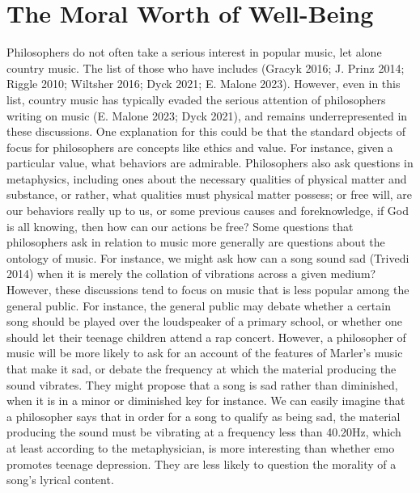 \documentclass[12pt]{book}
\theoremstyle{definition}
\theoremstyle{remark}
\begin{document}
\chapter{The Moral Worth of Well-Being}\label{the-moral-worth-of-well-being}

Philosophers do not often take a serious interest in popular music, let alone country music. The list of those who have includes (Gracyk 2016; J. Prinz 2014; Riggle 2010; Wiltsher 2016; Dyck 2021; E. Malone 2023). However, even in this list, country music has typically evaded the serious attention of philosophers writing on music (E. Malone 2023; Dyck 2021), and remains underrepresented in these discussions. One explanation for this could be that the standard objects of focus for philosophers are concepts like ethics and value. For instance, given a particular value, what behaviors are admirable. Philosophers also ask questions in metaphysics, including ones about the necessary qualities of physical matter and substance, or rather, what qualities must physical matter possess; or free will, are our behaviors really up to us, or some previous causes and foreknowledge, if God is all knowing, then how can our actions be free? Some questions that philosophers ask in relation to music more generally are questions about the ontology of music. For instance, we might ask how can a song sound sad (Trivedi 2014) when it is merely the collation of vibrations across a given medium? However, these discussions tend to focus on music that is less popular among the general public. For instance, the general public may debate whether a certain song should be played over the loudspeaker of a primary school, or whether one should let their teenage children attend a rap concert. However, a philosopher of music will be more likely to ask for an account of the features of Marler's music that make it sad, or debate the frequency at which the material producing the sound vibrates. They might propose that a song is sad rather than diminished, when it is in a minor or diminished key for instance. We can easily imagine that a philosopher says that in order for a song to qualify as being sad, the material producing the sound must be vibrating at a frequency less than 40.20Hz, which at least according to the metaphysician, is more interesting than whether emo promotes teenage depression. They are less likely to question the morality of a song's lyrical content.
\end{document}
